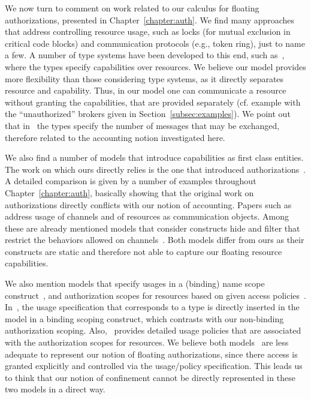 

We now turn to comment on work related to our calculus for floating authorizations, presented in Chapter~\ref{chapter:auth}.
We find many approaches that address controlling resource usage, such as locks (for mutual exclusion in critical code blocks) and communication protocols 
(e.g., token ring), just to name a few. 
A number of type systems have been developed to this end, such
as~\cite{DBLP:conf/lics/Das0P18,DBLP:journals/jlp/GorlaP09,DBLP:conf/esop/SwamyCC10}, 
where the types specify capabilities over resources. We believe our model provides more flexibility than those considering type systems, as it directly separates resource and capability. Thus, in our model one can communicate a resource without granting the capabilities, that are provided 
separately (cf. example with the ``unauthorized'' brokers given in Section~\ref{subsec:examples}).
We point out that in~\cite{DBLP:conf/lics/Das0P18} the types specify the number of messages that may be exchanged, therefore related to the accounting notion
 investigated here. 

We also find a number of models that introduce capabilities as first class entities. The work on which ours directly relies is the one that introduced authorizations~\cite{DBLP:journals/corr/GhilezanJPPV16, clar:eke}. A detailed comparison is given by a number of examples throughout Chapter~\ref{chapter:auth}, basically showing that the original work on authorizations directly conflicts with our notion of accounting.
Papers such 
as~\cite{DBLP:journals/scp/BodeiDF17,Giunti,DBLP:journals/lmcs/KobayashiSW06,vivas02} address usage
of channels and of resources as communication objects. 
Among these are already mentioned models that consider constructs hide and filter that restrict the behaviors allowed on channels~\cite{Giunti,vivas02}. Both models differ from ours as their constructs are static and therefore not able to 
capture our floating resource capabilities.

We also mention models that specify usages in a (binding) name scope 
construct~\cite{DBLP:journals/lmcs/KobayashiSW06}, and authorization scopes for resources based 
on given access policies~\cite{DBLP:journals/scp/BodeiDF17}. In~\cite{DBLP:journals/lmcs/KobayashiSW06}, 
the usage specification that corresponds to a type is directly inserted in the model in a binding 
scoping construct, which contrasts with our non-binding authorization scoping.
Also,~\cite{DBLP:journals/scp/BodeiDF17} provides detailed usage policies 
that are associated with the authorization scopes for resources. 
We believe both models~\cite{DBLP:journals/scp/BodeiDF17,DBLP:journals/lmcs/KobayashiSW06} are less 
adequate to represent our notion of floating authorizations, since there access is granted explicitly and 
controlled via the usage/policy specification. This leads us to think that our notion of confinement cannot be directly represented in these two models in a direct way.

